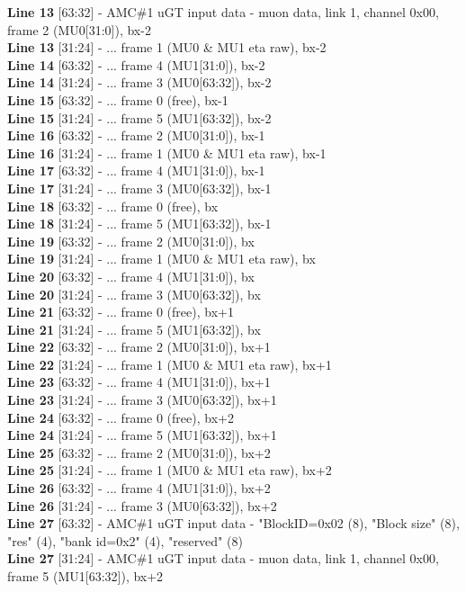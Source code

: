 \textbf{Line 13} [63:32] - AMC\#1 uGT input data - muon data, link 1, channel 0x00, frame 2 (MU0[31:0]), bx-2\\
\textbf{Line 13} [31:24] - ... frame 1 (MU0 \& MU1 eta raw), bx-2\\
\textbf{Line 14} [63:32] - ... frame 4 (MU1[31:0]), bx-2\\
\textbf{Line 14} [31:24] - ... frame 3 (MU0[63:32]), bx-2\\
\textbf{Line 15} [63:32] - ... frame 0 (free), bx-1\\
\textbf{Line 15} [31:24] - ... frame 5 (MU1[63:32]), bx-2\\
\textbf{Line 16} [63:32] - ... frame 2 (MU0[31:0]), bx-1\\
\textbf{Line 16} [31:24] - ... frame 1 (MU0 \& MU1 eta raw), bx-1\\
\textbf{Line 17} [63:32] - ... frame 4 (MU1[31:0]), bx-1\\
\textbf{Line 17} [31:24] - ... frame 3 (MU0[63:32]), bx-1\\
\textbf{Line 18} [63:32] - ... frame 0 (free), bx\\
\textbf{Line 18} [31:24] - ... frame 5 (MU1[63:32]), bx-1\\
\textbf{Line 19} [63:32] - ... frame 2 (MU0[31:0]), bx\\
\textbf{Line 19} [31:24] - ... frame 1 (MU0 \& MU1 eta raw), bx\\
\textbf{Line 20} [63:32] - ... frame 4 (MU1[31:0]), bx\\
\textbf{Line 20} [31:24] - ... frame 3 (MU0[63:32]), bx\\
\textbf{Line 21} [63:32] - ... frame 0 (free), bx+1\\
\textbf{Line 21} [31:24] - ... frame 5 (MU1[63:32]), bx\\
\textbf{Line 22} [63:32] - ... frame 2 (MU0[31:0]), bx+1\\
\textbf{Line 22} [31:24] - ... frame 1 (MU0 \& MU1 eta raw), bx+1\\
\textbf{Line 23} [63:32] - ... frame 4 (MU1[31:0]), bx+1\\
\textbf{Line 23} [31:24] - ... frame 3 (MU0[63:32]), bx+1\\
\textbf{Line 24} [63:32] - ... frame 0 (free), bx+2\\
\textbf{Line 24} [31:24] - ... frame 5 (MU1[63:32]), bx+1\\
\textbf{Line 25} [63:32] - ... frame 2 (MU0[31:0]), bx+2\\
\textbf{Line 25} [31:24] - ... frame 1 (MU0 \& MU1 eta raw), bx+2\\
\textbf{Line 26} [63:32] - ... frame 4 (MU1[31:0]), bx+2\\
\textbf{Line 26} [31:24] - ... frame 3 (MU0[63:32]), bx+2\\
\textbf{Line 27} [63:32] - AMC\#1 uGT input data - "BlockID=0x02 (8), "Block size" (8), "res" (4), "bank id=0x2" (4), "reserved" (8)\\
\textbf{Line 27} [31:24] - AMC\#1 uGT input data - muon data, link 1, channel 0x00, frame 5 (MU1[63:32]), bx+2

